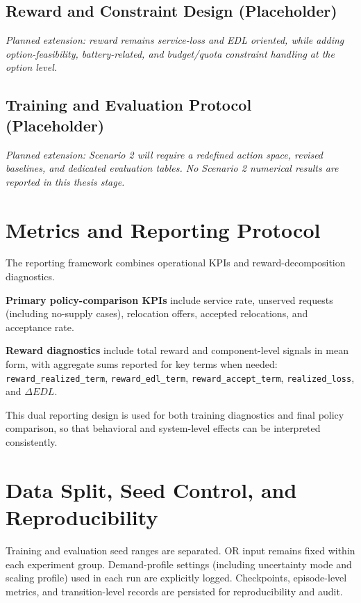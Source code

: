 \subsection{Reward and Constraint Design (Placeholder)}

\textit{Planned extension: reward remains service-loss and EDL oriented, while adding option-feasibility, battery-related, and budget/quota constraint handling at the option level.}

\subsection{Training and Evaluation Protocol (Placeholder)}

\textit{Planned extension: Scenario 2 will require a redefined action space, revised baselines, and dedicated evaluation tables. No Scenario 2 numerical results are reported in this thesis stage.}

\section{Metrics and Reporting Protocol}

The reporting framework combines operational KPIs and reward-decomposition diagnostics.

\textbf{Primary policy-comparison KPIs} include service rate, unserved requests (including no-supply cases), relocation offers, accepted relocations, and acceptance rate.

\textbf{Reward diagnostics} include total reward and component-level signals in mean form, with aggregate sums reported for key terms when needed: \texttt{reward\_realized\_term}, \texttt{reward\_edl\_term}, \texttt{reward\_accept\_term}, \texttt{realized\_loss}, and \(\Delta EDL\).

This dual reporting design is used for both training diagnostics and final policy comparison, so that behavioral and system-level effects can be interpreted consistently.

\section{Data Split, Seed Control, and Reproducibility}

Training and evaluation seed ranges are separated. OR input remains fixed within each experiment group. Demand-profile settings (including uncertainty mode and scaling profile) used in each run are explicitly logged. Checkpoints, episode-level metrics, and transition-level records are persisted for reproducibility and audit.


